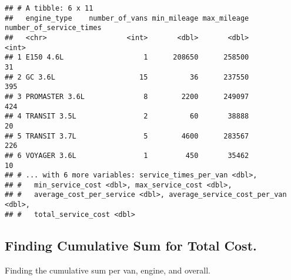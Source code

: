 \documentclass[
]{article}
\begin{document}
\begin{verbatim}
## # A tibble: 6 x 11
##   engine_type    number_of_vans min_mileage max_mileage number_of_service_times
##   <chr>                   <int>       <dbl>       <dbl>                   <int>
## 1 E150 4.6L                   1      208650      258500                      31
## 2 GC 3.6L                    15          36      237550                     395
## 3 PROMASTER 3.6L              8        2200      249097                     424
## 4 TRANSIT 3.5L                2          60       38888                      20
## 5 TRANSIT 3.7L                5        4600      283567                     226
## 6 VOYAGER 3.6L                1         450       35462                      10
## # ... with 6 more variables: service_times_per_van <dbl>,
## #   min_service_cost <dbl>, max_service_cost <dbl>,
## #   average_cost_per_service <dbl>, average_service_cost_per_van <dbl>,
## #   total_service_cost <dbl>
\end{verbatim}

\hypertarget{finding-cumulative-sum-for-total-cost.}{%
\subsection{Finding Cumulative Sum for Total
Cost.}\label{finding-cumulative-sum-for-total-cost.}}

Finding the cumulative sum per van, engine, and overall.
\end{document}
